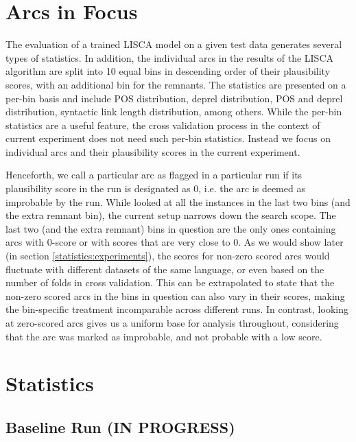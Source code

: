 \section{Arcs in Focus}
\label{arcs:focus}

The evaluation of a trained LISCA model on a given test data generates several types of statistics. In addition, the individual arcs in the results of the LISCA algorithm are split into 10 equal bins in descending order of their plausibility scores, with an additional bin for the remnants. The statistics are presented on a per-bin basis and include POS distribution, deprel distribution, POS and deprel distribution, syntactic link length distribution, among others. While the per-bin statistics are a useful feature, the cross validation process in the context of current experiment does not need such per-bin statistics. Instead we focus on individual arcs and their plausibility scores in the current experiment.

Henceforth, we call a particular arc as flagged in a particular run if its plausibility score in the run is designated as 0, i.e. the arc is deemed as improbable by the run. While \cite{alzetta2017dangerous} looked at all the instances in the last two bins (and the extra remnant bin), the current setup narrows down the search scope. The last two (and the extra remnant) bins in question are the only ones containing arcs with 0-score or with scores that are very close to 0. As we would show later (in section \ref{statistics:experiments}), the scores for non-zero scored arcs would fluctuate with different datasets of the same language, or even based on the number of folds in cross validation. This can be extrapolated to state that the non-zero scored arcs in the bins in question can also vary in their scores, making the bin-specific treatment incomparable across different runs. In contrast, looking at zero-scored arcs gives us a uniform base for analysis throughout, considering that the arc was marked as improbable, and not probable with a low score.

\section{Statistics}

\subsection{Baseline Run (IN PROGRESS)}
\label{statistics:baseline}

